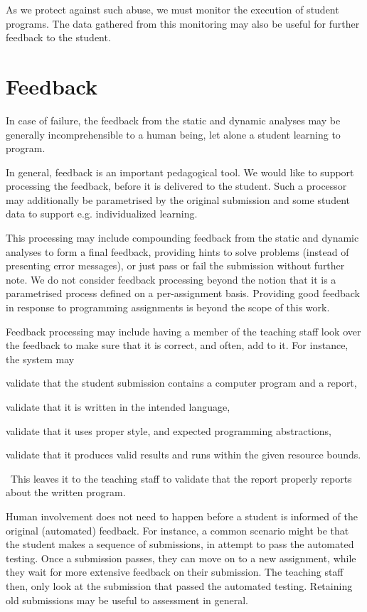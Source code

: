 As we protect against such abuse, we must monitor the execution of student
programs. The data gathered from this monitoring may also be useful for further
feedback to the student.

\section{Feedback}

In case of failure, the feedback from the static and dynamic analyses may be
generally incomprehensible to a human being\cite{lerner-et-al-2007}, let alone
a student learning to program\cite{mccauley-et-al-2008}.

In general, feedback is an important pedagogical tool. We would like to support
processing the feedback, before it is delivered to the student. Such a
processor may additionally be parametrised by the original submission and some
student data to support e.g. individualized learning.

This processing may include compounding feedback from the static and dynamic
analyses to form a final feedback, providing hints to solve problems (instead
of presenting error messages), or just pass or fail the submission without
further note. We do not consider feedback processing beyond the notion that it
is a parametrised process defined on a per-assignment basis. Providing good
feedback in response to programming assignments is beyond the scope of this
work.

Feedback processing may include having a member of the teaching staff look over
the feedback to make sure that it is correct, and often, add to it. For
instance, the system may \begin{inparaenum}[(a)] \item validate that the
student submission contains a computer program and a report, \item validate
that it is written in the intended language, \item validate that it uses proper
style, and expected programming abstractions, \item validate that it produces
valid results and runs within the given resource bounds.\end{inparaenum}~This
leaves it to the teaching staff to validate that the report properly reports
about the written program.

Human involvement does not need to happen before a student is informed of the
original (automated) feedback. For instance, a common scenario might be that
the student makes a sequence of submissions, in attempt to pass the automated
testing. Once a submission passes, they can move on to a new assignment, while
they wait for more extensive feedback on their submission. The teaching staff
then, only look at the submission that passed the automated testing. Retaining
old submissions may be useful to assessment in general. 

